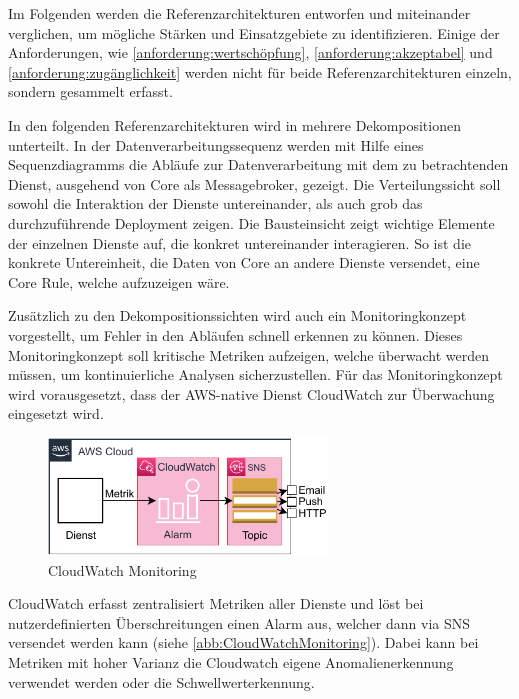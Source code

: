 Im Folgenden werden die Referenzarchitekturen entworfen und miteinander verglichen, um mögliche Stärken und Einsatzgebiete zu identifizieren. Einige der Anforderungen, wie \ref{anforderung:wertschöpfung}, \ref{anforderung:akzeptabel} und \ref{anforderung:zugänglichkeit} werden nicht für beide Referenzarchitekturen einzeln, sondern gesammelt erfasst.

In den folgenden Referenzarchitekturen wird in mehrere Dekompositionen unterteilt. In der Datenverarbeitungssequenz werden mit Hilfe eines Sequenzdiagramms die Abläufe zur Datenverarbeitung mit dem zu betrachtenden Dienst, ausgehend von \AWSIOT{} Core als Messagebroker, gezeigt.
Die Verteilungssicht soll sowohl die Interaktion der Dienste untereinander, als auch grob das durchzuführende Deployment zeigen. Die Bausteinsicht zeigt wichtige Elemente der einzelnen Dienste auf, die konkret untereinander interagieren. So ist die konkrete Untereinheit, die Daten von \AWSIOT{} Core an andere Dienste versendet, eine \AWSIOT{} Core Rule, welche aufzuzeigen wäre.

Zusätzlich zu den Dekompositionssichten wird auch ein Monitoringkonzept vorgestellt, um Fehler in den Abläufen schnell erkennen zu können. Dieses Monitoringkonzept soll kritische Metriken aufzeigen, welche überwacht werden müssen, um kontinuierliche Analysen sicherzustellen. Für das Monitoringkonzept wird vorausgesetzt, dass der \ac{AWS}-native Dienst CloudWatch zur Überwachung eingesetzt wird. 
\begin{figure}[H]
\centering
\includegraphics[width=0.66\textwidth]{graphics/CloudWatch-Monitoring}
\caption{CloudWatch Monitoring}
\label{abb:CloudWatchMonitoring}
\end{figure}
CloudWatch erfasst zentralisiert Metriken aller Dienste und löst bei nutzerdefinierten Überschreitungen einen Alarm aus, welcher dann via \ac{SNS} versendet werden kann (siehe \autoref{abb:CloudWatchMonitoring}). Dabei kann bei Metriken mit hoher Varianz die Cloudwatch eigene Anomalienerkennung verwendet werden oder die Schwellwerterkennung.



